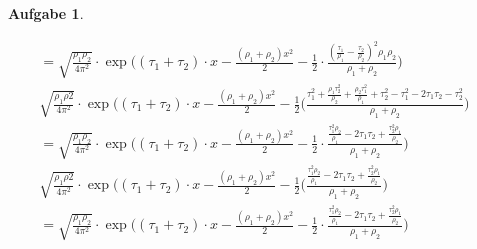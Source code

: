 \documentclass[12pt]{scrartcl}
\theoremstyle{definition}
\theoremstyle{exercise}
\newtheorem*{exercise*}{Aufgabe}
\begin{document}
\begin{exercise*}
\begin{enumerate}
\begin{align*}
					= \sqrt{\frac{\rho_{1} \rho_{2}}{4 \pi^{2}}}\cdot \exp\bigg((\tau_{1} + \tau_{2}) \cdot x - \frac{(\rho_{1} + \rho_{2})x^{2}}{2}- \frac{1}{2} \cdot \frac{(\frac{\tau_1}{\rho_1}- \frac{\tau_2}{\rho_2})^{2} \rho_{1} \rho_{2}}{\rho_{1} + \rho_{2}}\bigg)                                                                                                                                                                                                         &  \\
					\sqrt{\frac{\rho_{1} \rho2}{4 \pi^{2}}}\cdot \exp\bigg((\tau_{1} + \tau_{2}) \cdot x - \frac{(\rho_{1} + \rho_{2})x^{2}}{2}- \frac{1}{2}(\frac{\tau_{1}^{2} + \frac{\rho_1 \tau_2^2}{\rho_2}+ \frac{\rho_2 \tau_1^2}{\rho_1}+ \tau_{2}^{2} - \tau_{1}^{2} - 2\tau_{1}\tau_{2} - \tau_{2}^{2}}{\rho_{1} + \rho_{2}}\bigg)                                                                                                                                           &  \\
					= \sqrt{\frac{\rho_{1} \rho_{2}}{4 \pi^{2}}}\cdot \exp\bigg((\tau_{1} + \tau_{2}) \cdot x - \frac{(\rho_{1} + \rho_{2})x^{2}}{2}- \frac{1}{2} \cdot \frac{\frac{\tau_1^2\rho_2}{\rho_1}- 2 \tau_{1} \tau_{2} + \frac{\tau_2^2\rho_1}{\rho_2}}{\rho_{1} + \rho_{2}}\bigg)                                                                                                                                                                                           &  \\
					\sqrt{\frac{\rho_{1} \rho2}{4 \pi^{2}}}\cdot \exp\bigg((\tau_{1} + \tau_{2}) \cdot x - \frac{(\rho_{1} + \rho_{2})x^{2}}{2}- \frac{1}{2}(\frac{\frac{\tau_1^2\rho_2}{\rho_1}- 2 \tau_{1} \tau_{2} + \frac{\tau_2^2\rho_1}{\rho_2}}{\rho_{1} + \rho_{2}}\bigg)                                                                                                                                                                                                      &  \\
					= \sqrt{\frac{\rho_{1} \rho_{2}}{4 \pi^{2}}}\cdot \exp\bigg((\tau_{1} + \tau_{2}) \cdot x - \frac{(\rho_{1} + \rho_{2})x^{2}}{2}- \frac{1}{2} \cdot \frac{\frac{\tau_1^2\rho_2}{\rho_1}- 2 \tau_{1} \tau_{2} + \frac{\tau_2^2\rho_1}{\rho_2}}{\rho_{1} + \rho_{2}}\bigg)
				\end{align*}
		\end{enumerate}
	\end{exercise*}
\end{document}
